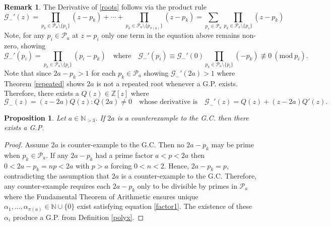 \documentclass[12pt,a4paper]{amsart}
\numberwithin{equation}{section}
\theoremstyle{theorem}
\theoremstyle{definition}
\newtheorem{proposition}{Proposition}
\newtheorem{remark}{Remark}
\theoremstyle{remark}
\theoremstyle{con}
\newcommand{\Mod}[1]{\ (\mathrm{mod}\ #1)}
\begin{document}
\begin{remark}\label{pderiv}
The Derivative of \ref{roots} follows via the product rule
\begin{equation}
 \mathcal{G}_-'(z) = \prod_{p_k \in \mathcal{P}_a \setminus \{p_1\}} (z - p_k)  +\cdots + \prod_{p_k \in \mathcal{P}_a \setminus \{p_{\pi(a)}\}} (z - p_k)    = \sum_{p_s \in \mathcal{P}_a} \prod_{p_k \in \mathcal{P}_a \setminus \{p_s\}} (z - p_k) 
 \end{equation}
 Note, for any $p_i \in \mathcal{P}_a$ at $z = p_i$ only one term in the equation above remains non-zero, showing
 \begin{equation}\label{roots1}
  \mathcal{G}_-'(p_i) =  \prod_{p_k \in \mathcal{P}_a \setminus \{p_i\}} (p_i - p_k)\quad \text{where} \quad  \mathcal{G}_-'(p_i)  \equiv \mathcal{G}_-'(0)  \prod_{p_k \in \mathcal{P}_a \setminus \{p_i\}} (- p_k)\not \equiv 0 \Mod{p_i}.
 \end{equation} 
Note that since $2a - p_k > 1$ for each $p_k \in \mathcal{P}_a$ showing $\mathcal{G}_-'(2a) > 1$ where Theorem \ref{repeated} shows $2a$ is not a repeated root whenever a G.P. exists.
Therefore, there exists a $Q(z) \in \mathbb{Z}[z]$ where 
\begin{equation}\label{factor}
\mathcal{G}_-(z) = (z - 2a)Q(z) : Q(2a) \neq 0 \quad \text{whose derivative is} \quad \mathcal{G}_-'(z) = Q(z) + (z - 2a)Q'(z).
\end{equation}
\end{remark}




 
\begin{proposition}\label{gbf}
\textit{Let $a \in \mathbb{N}_{> 3}$. If $2a$ is a counterexample to the G.C. then there exists a G.P.}
\end{proposition}

\begin{proof}
Assume $2a$ is counter-example to the G.C. Then no $2a - p_k$ may be prime when $p_k \in \mathcal{P}_a$. If any $2a - p_k$ had a prime factor $a < p < 2a$ then $0< 2a - p_k = n p < 2a$ with $p > a$ forcing $0<n < 2$. Hence, $2a - p_k = p$, contradicting the assumption that $2a$ is a counter-example to the G.C. Therefore, any counter-example requires each $2a - p_k$ only to be divisible by primes in $\mathcal{P}_a$ where the Fundamental Theorem of Arithmetic ensures unique $\alpha_1, \dots, \alpha_{\pi(a)} \in \mathbb{N}\cup \{0\}$ exist satisfying equation \ref{factor1}. The existence of these $\alpha_i$ produce a G.P. from Definition \ref{polyx}.
\end{proof}
 
\end{document}
